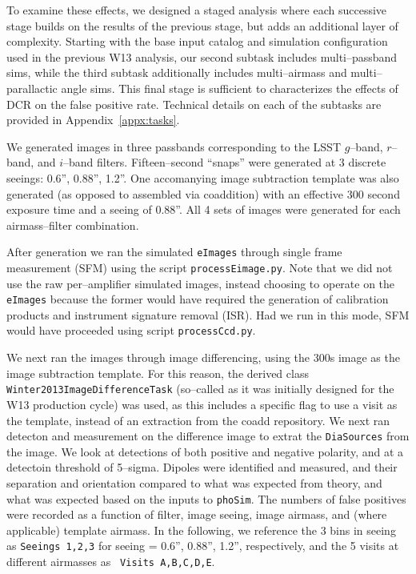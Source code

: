 \documentclass[prd, nofootinbib, floatfix, 11pt, tightenlines, times]{article}
\begin{document}
To examine these effects, we designed a staged analysis where each
successive stage builds on the results of the previous stage, but adds
an additional layer of complexity.  Starting with the base input
catalog and simulation configuration used in the previous W13
analysis, our second subtask includes multi--passband sims, while the
third subtask additionally includes multi--airmass and
multi--parallactic angle sims.  This final stage is sufficient to
characterizes the effects of DCR on the false positive rate.
Technical details on each of the subtasks are provided in
Appendix~\ref{appx:tasks}.

We generated images in three passbands corresponding to the LSST
$g$--band, $r$--band, and $i$--band filters.  Fifteen--second
``snaps'' were generated at 3 discrete seeings: 0.6'', 0.88'', 1.2''.
One accomanying image subtraction template was also generated (as
opposed to assembled via coaddition) with an effective 300 second
exposure time and a seeing of 0.88''.  All 4 sets of images were
generated for each airmass--filter combination.

After generation we ran the simulated {\tt eImages} through single
frame measurement (SFM) using the script {\tt processEimage.py}.  Note
that we did not use the raw per--amplifier simulated images, instead
choosing to operate on the {\tt eImages} because the former would have
required the generation of calibration products and instrument
signature removal (ISR).  Had we run in this mode, SFM would have
proceeded using script {\tt processCcd.py}.

We next ran the images through image differencing, using the 300s
image as the image subtraction template.  For this reason, the derived
class {\tt Winter2013ImageDifferenceTask} (so--called as it was
initially designed for the W13 production cycle) was used, as this
includes a specific flag to use a visit as the template, instead of an
extraction from the coadd repository.  We next ran detecton and
measurement on the difference image to extrat the {\tt DiaSources}
from the image.  We look at detections of both positive and negative
polarity, and at a detectoin threshold of 5--sigma.  Dipoles were
identified and measured, and their separation and orientation compared
to what was expected from theory, and what was expected based on the
inputs to {\tt phoSim}.  The numbers of false positives were recorded
as a function of filter, image seeing, image airmass, and (where
applicable) template airmass.  In the following, we reference the 3
bins in seeing as {\tt Seeings 1,2,3} for seeing = 0.6'', 0.88'',
1.2'', respectively, and the 5 visits at different airmasses as {\tt
  Visits A,B,C,D,E}.
\end{document}
